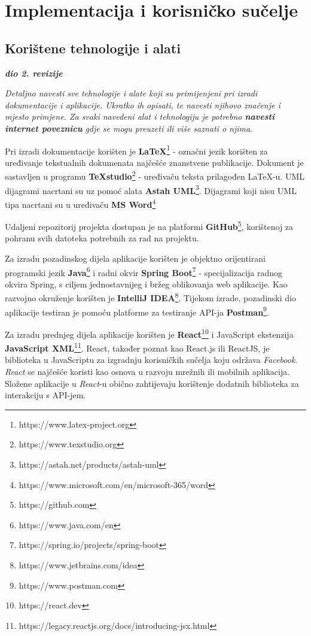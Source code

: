 \chapter{Implementacija i korisničko sučelje}
		
		
		\section{Korištene tehnologije i alati}
		
			\textbf{\textit{dio 2. revizije}}
			
			 \textit{Detaljno navesti sve tehnologije i alate koji su primijenjeni pri izradi dokumentacije i aplikacije. Ukratko ih opisati, te navesti njihovo značenje i mjesto primjene. Za svaki navedeni alat i tehnologiju je potrebno \textbf{navesti internet poveznicu} gdje se mogu preuzeti ili više saznati o njima}.
			
			\indent Pri izradi dokumentacije korišten je \textbf{LaTeX}\footnote{https://www.latex-project.org} - označni jezik korišten za uređivanje tekstualnih dokumenata najčešće znanstvene publikacije. Dokument je sastavljen u programu \textbf{TeXstudio}\footnote{https://www.texstudio.org} - uređivaču teksta prilagođen LaTeX-u. UML dijagrami nacrtani su uz pomoć alata \textbf{Astah UML}\footnote{https://astah.net/products/astah-uml}. Dijagrami koji nisu UML tipa nacrtani su u uređivaču \textbf{MS Word}\footnote{https://www.microsoft.com/en/microsoft-365/word}
			
			Udaljeni repozitorij projekta dostupan je na platformi \textbf{GitHub}\footnote{https://github.com}, korištenoj za pohranu svih datoteka potrebnih za rad na projektu.
			
			Za izradu pozadinskog dijela aplikacije korišten je objektno orijentirani programski jezik \textbf{Java}\footnote{https://www.java.com/en} i radni okvir \textbf{Spring Boot}\footnote{https://spring.io/projects/spring-boot} - specijalizacija radnog okvira Spring, s ciljem jednostavnijeg i bržeg oblikovanja web aplikacije. Kao razvojno okruženje korišten je \textbf{IntelliJ IDEA}\footnote{https://www.jetbrains.com/idea}. Tijekom izrade, pozadinski dio aplikacije testiran je pomoću platforme za testiranje API-ja \textbf{Postman}\footnote{https://www.postman.com}.
			
			Za izradu prednjeg dijela aplikacije korišten je \textbf{React}\footnote{https://react.dev} i JavaScript ekstenzija \textbf{JavaScript XML}\footnote{https://legacy.reactjs.org/docs/introducing-jsx.html}. React, također poznat kao React.js ili ReactJS, je biblioteka u JavaScriptu za izgradnju korisničkih sučelja koju održava \textit{Facebook}. \textit{React} se najčešće koristi kao osnova u razvoju mrežnih ili mobilnih aplikacija. Složene aplikacije u \textit{React}-u obično zahtijevaju korištenje dodatnih biblioteka za interakciju s API-jem.
			
